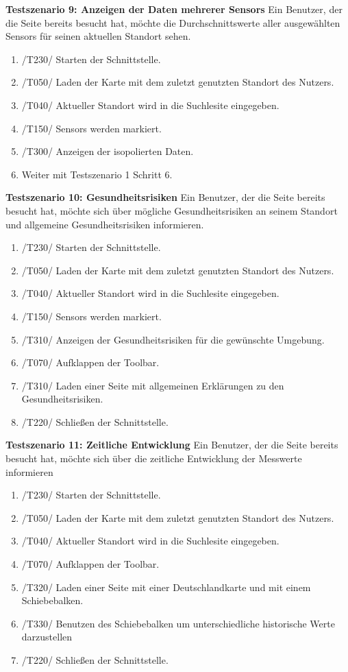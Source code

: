 \textbf{Testszenario 9: Anzeigen der Daten mehrerer \glspl{Sensor}}
\newline
Ein Benutzer, der die Seite bereits besucht hat, möchte die Durchschnittswerte aller ausgewählten \glspl{Sensor} für seinen aktuellen Standort sehen.
\begin{enumerate} [noitemsep]
    \item /T230/ Starten der Schnittstelle.
    \item /T050/ Laden der Karte mit dem zuletzt genutzten Standort des Nutzers.
    \item /T040/ Aktueller Standort wird in die Suchlesite eingegeben.
    \item /T150/ \glspl{Sensor} werden markiert.
    \item /T300/ Anzeigen der isopolierten Daten.
    \item Weiter mit Testszenario 1 Schritt 6.
\end{enumerate}

\textbf{Testszenario 10: Gesundheitsrisiken}
\newline
Ein Benutzer, der die Seite bereits besucht hat, möchte sich über mögliche Gesundheitsrisiken an seinem Standort und allgemeine Gesundheitsrisiken informieren.
\begin{enumerate} [noitemsep]
    \item /T230/ Starten der Schnittstelle.
    \item /T050/ Laden der Karte mit dem zuletzt genutzten Standort des Nutzers.
    \item /T040/ Aktueller Standort wird in die Suchlesite eingegeben.
    \item /T150/ \glspl{Sensor} werden markiert.
    \item /T310/ Anzeigen der Gesundheitsrisiken für die gewünschte Umgebung.
    \item /T070/ Aufklappen der \gls{Toolbar}.
    \item /T310/ Laden einer Seite mit allgemeinen Erklärungen zu den Gesundheitsrisiken.
    \item /T220/ Schließen der Schnittstelle.
\end{enumerate}

\textbf{Testszenario 11: Zeitliche Entwicklung}
\newline
Ein Benutzer, der die Seite bereits besucht hat, möchte sich über die zeitliche Entwicklung der Messwerte informieren
\begin{enumerate} [noitemsep]
    \item /T230/ Starten der Schnittstelle.
    \item /T050/ Laden der Karte mit dem zuletzt genutzten Standort des Nutzers.
    \item /T040/ Aktueller Standort wird in die Suchlesite eingegeben.
    \item /T070/ Aufklappen der \gls{Toolbar}.
    \item /T320/ Laden einer Seite mit einer Deutschlandkarte und mit einem Schiebebalken. 
    \item /T330/ Benutzen des Schiebebalken um unterschiedliche historische Werte darzustellen
    \item /T220/ Schließen der Schnittstelle.
\end{enumerate}
